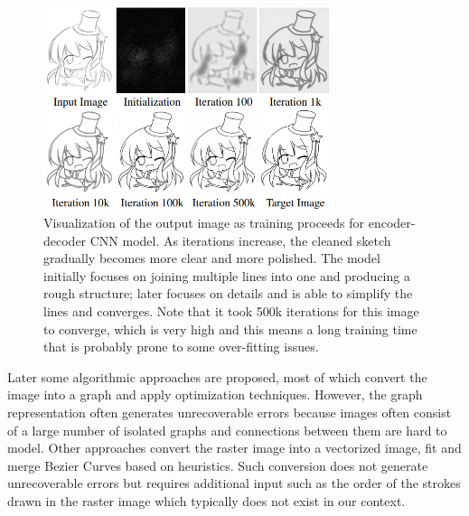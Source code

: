 \begin{figure}
    \centering
    \includegraphics[width=0.75\textwidth]{images/sketch/learning2simp.png}
    \caption[Visualization of the output image as training proceeds for encoder-decoder CNN model.]{Visualization of the output image as training proceeds for encoder-decoder CNN model. As iterations increase, the cleaned sketch gradually becomes more clear and more polished. The model initially focuses on joining multiple lines into one and producing a rough structure; later focuses on details and is able to simplify the lines and converges. Note that it took 500k iterations for this image to converge, which is very high and this means a long training time that is probably prone to some over-fitting issues.\cite{simo-serraLearningSimplifyFully2016}}
    \label{fig:learning2simp}
\end{figure}

Later some algorithmic approaches are proposed, most of which convert the image into a graph and apply optimization techniques\cite{favreauFidelityVsSimplicity2016}. However, the graph representation often generates unrecoverable errors because images often consist of a large number of isolated graphs and connections between them are hard to model. Other approaches convert the raster image into a vectorized image, fit and merge Bezier Curves based on heuristics\cite{fiserShipShapeDrawingBeautification}. Such conversion does not generate unrecoverable errors but requires additional input such as the order of the strokes drawn in the raster image which typically does not exist in our context.

